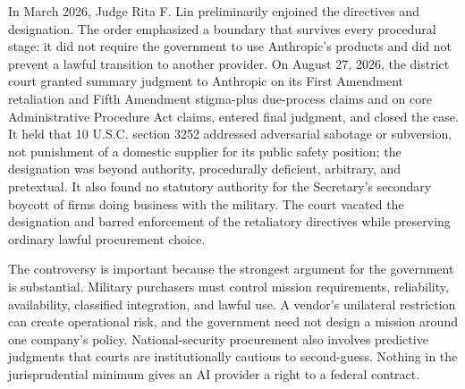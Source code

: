 In March 2026, Judge Rita F. Lin preliminarily enjoined the directives and designation. The order emphasized a boundary that survives every procedural stage: it did not require the government to use Anthropic's products and did not prevent a lawful transition to another provider. On August 27, 2026, the district court granted summary judgment to Anthropic on its First Amendment retaliation and Fifth Amendment stigma-plus due-process claims and on core Administrative Procedure Act claims, entered final judgment, and closed the case. It held that 10 U.S.C. section 3252 addressed adversarial sabotage or subversion, not punishment of a domestic supplier for its public safety position; the designation was beyond authority, procedurally deficient, arbitrary, and pretextual. It also found no statutory authority for the Secretary's secondary boycott of firms doing business with the military. The court vacated the designation and barred enforcement of the retaliatory directives while preserving ordinary lawful procurement choice.

The controversy is important because the strongest argument for the government is substantial. Military purchasers must control mission requirements, reliability, availability, classified integration, and lawful use. A vendor's unilateral restriction can create operational risk, and the government need not design a mission around one company's policy. National-security procurement also involves predictive judgments that courts are institutionally cautious to second-guess. Nothing in the jurisprudential minimum gives an AI provider a right to a federal contract.

